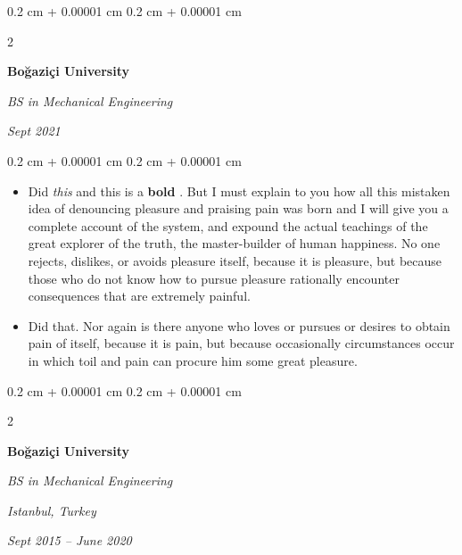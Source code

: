 \documentclass[10pt, letterpaper]{article}
\newenvironment{highlights}{
    \begin{itemize}[
        topsep=0.10 cm,
        parsep=0.10 cm,
        partopsep=0pt,
        itemsep=0pt,
        leftmargin=0.4 cm + 10pt
    ]
}{
    \end{itemize}
} %
\newenvironment{onecolentry}{
    \begin{adjustwidth}{
        0.2 cm + 0.00001 cm
    }{
        0.2 cm + 0.00001 cm
    }
}{
    \end{adjustwidth}
} %
\newenvironment{twocolentry}[2][]{
    \onecolentry
    \def\secondColumn{#2}
    \setcolumnwidth{\fill, 4.5 cm}
    \begin{paracol}{2}
}{
    \switchcolumn \raggedleft \secondColumn
    \end{paracol}
    \endonecolentry
} %
\let\hrefWithoutArrow\href
\renewcommand{\href}[2]{\hrefWithoutArrow{#1}{\ifthenelse{\equal{#2}{}}{ }{#2 }\raisebox{.15ex}{\footnotesize \faExternalLink*}}}
\begin{document}
        \vspace{0.2 cm}

        \begin{twocolentry}{
            
            
        \textit{Sept 2021}}
            \textbf{Boğaziçi University}

            \textit{BS in Mechanical Engineering}
        \end{twocolentry}

        \vspace{0.10 cm}
        \begin{onecolentry}
            \begin{highlights}
                \item Did \textit{this} and this is a \textbf{bold} \href{https://example.com}{link}. But I must explain to you how all this mistaken idea of denouncing pleasure and praising pain was born and I will give you a complete account of the system, and expound the actual teachings of the great explorer of the truth, the master-builder of human happiness. No one rejects, dislikes, or avoids pleasure itself, because it is pleasure, but because those who do not know how to pursue pleasure rationally encounter consequences that are extremely painful.
                \item Did that. Nor again is there anyone who loves or pursues or desires to obtain pain of itself, because it is pain, but because occasionally circumstances occur in which toil and pain can procure him some great pleasure.
            \end{highlights}
        \end{onecolentry}


        \vspace{0.2 cm}

        \begin{twocolentry}{
        \textit{Istanbul, Turkey}    
            
        \textit{Sept 2015 – June 2020}}
            \textbf{Boğaziçi University}

            \textit{BS in Mechanical Engineering}
        \end{twocolentry}
\end{document}
